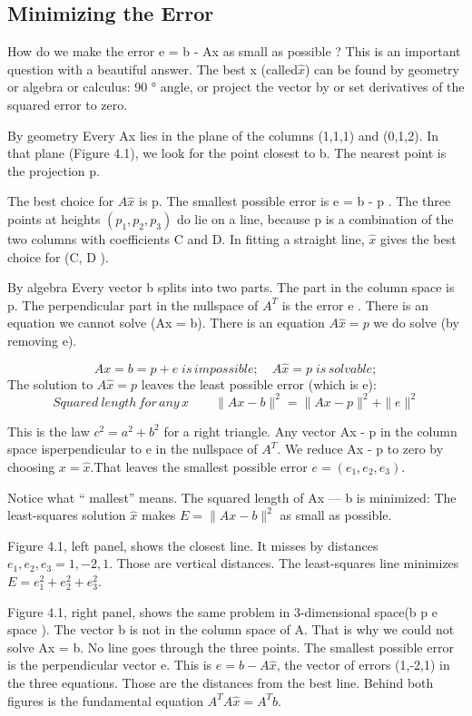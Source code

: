 	\subsection{Minimizing the Error}
	How do we make the error e = b - Ax as small as possible ? This is an important question
	with a beautiful answer. The best x (called$\hat{x}$) can be found by geometry or algebra or
	calculus: 90 ° angle, or project the vector by or set derivatives of the squared error to zero.
	
	By geometry Every Ax lies in the plane of the columns (1,1,1) and (0,1,2). In that plane
	(Figure 4.1), we look for the point closest to b. The nearest point is the projection p.
	
	The best choice for $A\hat{x}$ is p. The smallest possible error is e = b - p . The three
	points at heights $(p_1,p_2,p_3)$ do lie on a line, because p is a combination of the two
	columns with coefficients C and D. In fitting a straight line, $\hat{x}$ gives the best choice for (C, D ).
	
	By algebra Every vector b splits into two parts. The part in the column space is p. The
	perpendicular part in the nullspace of $A^T$ is the error e . There is an equation we cannot
	solve (Ax = b). There is an equation $A\hat{x}=p$ we do solve (by removing e).
	
	\begin{equation}
	Ax = b = p + e \;is\,impossible;  \quad  A\hat{x} = p \;is\,solvable;
	\end{equation}   
	The solution to $A\hat{x}=p$ leaves the least possible error (which is e):
	\begin{equation}
	Squared\:length\, for\, any \,x \qquad \|Ax-b\|^2 = \|Ax-p\|^2 + \|e\|^2
	\end{equation}
	
	This is the law $c^2=a^2+b^2$ for a right triangle. Any vector Ax - p in the column space isperpendicular to e in the nullspace of $A^T$. We reduce Ax - p to zero by choosing $x=\hat{x}$.That leaves the smallest possible error $e=(e_1,e_2,e_3)$.
	
	Notice what “ mallest” means. The squared length of Ax — b is minimized: The
	least-squares solution $\hat{x}$ makes $E=\|Ax-b\|^2$ as small as possible.
	
	Figure 4.1, left panel, shows the closest line. It misses by distances $e_1,e_2,e_3 = 1,-2,1$. Those are vertical distances. The least-squares line minimizes $E=e^2_1+e^2_2+e^2_3$.
	
	Figure 4.1, right panel, shows the same problem in 3-dimensional space(b p e space ). The vector b is not in the column space of A. That is why we could not solve Ax = b. No line goes through the three points. The smallest possible error is the perpendicular vector e. This is $e=b-A\hat{x}$, the vector of errors (1,-2,1) in the three equations. Those are the distances from the best line. Behind both figures is the fundamental equation $A^TA\hat{x}=A^Tb$.
	
